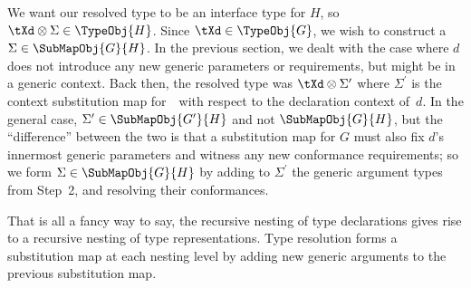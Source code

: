 \documentclass[../generics]{subfiles}
\begin{document}
We want our resolved type to be an interface type for $H$, so $\tXd\otimes\Sigma\in\TypeObj{H}$. Since $\tXd\in\TypeObj{G}$, we wish to construct a $\Sigma\in\SubMapObj{G}{H}$. In the previous section, we dealt with the case where $d$ does not introduce any new generic parameters or requirements, but might be in a generic context. Back then, the resolved type was $\tXd\otimes\Sigma^\prime$ where  $\Sigma^\prime$ is the context substitution map for~\tT\ with respect to the declaration context of~$d$. In the general case, $\Sigma^\prime\in\SubMapObj{G^\prime}{H}$ and not $\SubMapObj{G}{H}$, but the ``difference'' between the two is that a substitution map for $G$ must also fix $d$'s innermost generic parameters and witness any new conformance requirements; so we form $\Sigma\in\SubMapObj{G}{H}$ by adding to $\Sigma^\prime$ the generic argument types from Step~2, and resolving their conformances.

That is all a fancy way to say, the recursive nesting of type declarations gives rise to a recursive nesting of type representations. Type resolution forms a substitution map at each nesting level by adding new generic arguments to the previous substitution map.
\end{document}
